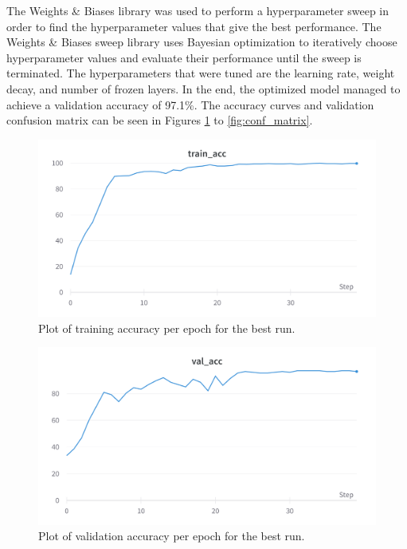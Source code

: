 \documentclass[a4paper,11pt]{article}
\begin{document}
The Weights \& Biases library was used to perform a hyperparameter sweep in order to find the hyperparameter values that give the best performance. The Weights \& Biases sweep library uses Bayesian optimization to iteratively choose hyperparameter values and evaluate their performance until the sweep is terminated. The hyperparameters that were tuned are the learning rate, weight decay, and number of frozen layers. In the end, the optimized model managed to achieve a validation accuracy of 97.1\%. The accuracy curves and validation confusion matrix can be seen in Figures \ref{fig:train_acc} to \ref{fig:conf_matrix}.

\begin{figure}[H]
\centering
\includegraphics[scale=0.09]{img/cv/money/train_acc.png}
\caption{Plot of training accuracy per epoch for the best run.}
\label{fig:train_acc}
\end{figure}

\begin{figure}[H]
\centering
\includegraphics[scale=0.09]{img/cv/money/val_acc.png}
\caption{Plot of validation accuracy per epoch for the best run.}
\label{fig:val_acc}
\end{figure}
\end{document}
